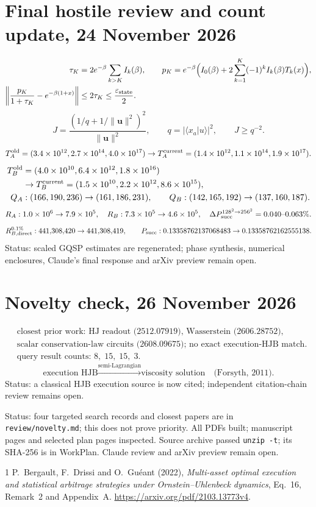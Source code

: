 \documentclass[11pt,a4paper]{article}
\begin{document}
\section*{Final hostile review and count update, 24 November 2026}
\[
 \begin{aligned}
 \tau_K&=2e^{-\beta}\sum_{k>K}I_k(\beta),\qquad
 p_K=e^{-\beta}\Bigl(I_0(\beta)+2\sum_{k=1}^K(-1)^kI_k(\beta)T_k(x)\Bigr),\\
 \left\|\frac{p_K}{1+\tau_K}-e^{-\beta(1+x)}\right\|&\le2\tau_K
 \le\frac{\varepsilon_{\rm state}}2.
 \end{aligned}
\]
\[
 J=\frac{(1/q+1/\|\mathbf u\|^2)^2}{\|\mathbf u\|^2},\qquad
 q=|\langle x_a|u\rangle|^2,\qquad J\ge q^{-2}.
\]
\[
 T_A^{\rm old}=(3.4\times10^{12},2.7\times10^{14},4.0\times10^{17})
 \to T_A^{\rm current}=(1.4\times10^{12},1.1\times10^{14},1.9\times10^{17}).
\]
\[
 \begin{aligned}
 T_B^{\rm old}&=(4.0\times10^{10},6.4\times10^{12},1.8\times10^{16})\\
 &\to T_B^{\rm current}=(1.5\times10^{10},2.2\times10^{12},8.6\times10^{15}),\\
 Q_A&:(166,190,236)\to(161,186,231),\qquad Q_B:(142,165,192)\to(137,160,187).
 \end{aligned}
\]
\[
 R_A:1.0\times10^6\to7.9\times10^5,\quad
 R_B:7.3\times10^5\to4.6\times10^5,\quad
 \Delta P_{\rm succ}^{128^2\to256^2}=0.040\text{--}0.063\%.
\]
\[
 R_{B,\rm direct}^{0.1\%}:441{,}308{,}420\to441{,}308{,}419,\qquad
 P_{\rm succ}:0.13358762137068483\to0.13358762162555138.
\]
Status: scaled GQSP estimates are regenerated; phase synthesis, numerical enclosures, Claude's final response and arXiv preview remain open.

\section*{Novelty check, 26 November 2026}
\[
 \begin{aligned}
 &\text{closest prior work: HJ readout (2512.07919), Wasserstein (2606.28752),}\\
 &\text{scalar conservation-law circuits (2608.09675); no exact execution-HJB match.}\\
 &\text{query result counts: }8,\;15,\;15,\;3.
 \end{aligned}
\]
\[
 \text{execution HJB}\xrightarrow{\text{semi-Lagrangian}}\text{viscosity solution}\quad\text{(Forsyth, 2011).}
\]
Status: a classical HJB execution source is now cited; independent citation-chain review remains open.

Status: four targeted search records and closest papers are in \texttt{review/novelty.md}; this does not prove priority. All PDFs built; manuscript pages and selected plan pages inspected. Source archive passed \texttt{unzip -t}; its SHA-256 is in WorkPlan. Claude review and arXiv preview remain open.

\begin{thebibliography}{1}
 P.~Bergault, F.~Drissi and O.~Gu\'eant (2022),
\emph{Multi-asset optimal execution and statistical arbitrage strategies
under Ornstein--Uhlenbeck dynamics}, Eq.~16, Remark~2 and Appendix~A.
\url{https://arxiv.org/pdf/2103.13773v4}.
\end{thebibliography}
\end{document}
